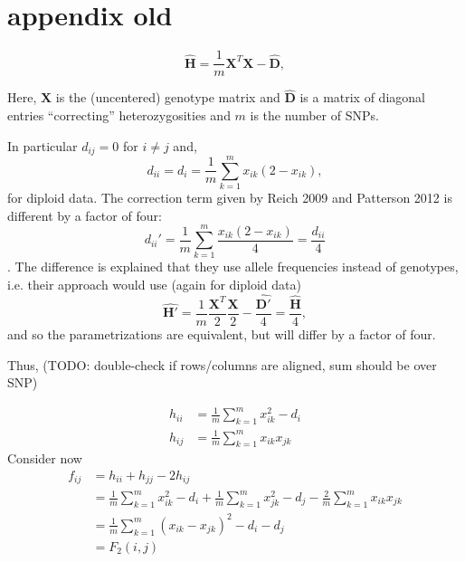 \documentclass[12pt, letterpaper]{article}
\newcommand{\MX}{\mathbf{X}}
\begin{document}
\section{appendix old}
\begin{equation}
    \hat{\mathbf{H}} = \frac{1}{m}\mathbf{X}^T\mathbf{X} - \hat{\mathbf{D}},
\end{equation}

Here, $\MX$ is the (uncentered) genotype matrix and $\hat{\mathbf{D}}$ is a matrix of diagonal entries ``correcting'' heterozygosities and $m$ is the number of SNPs.

In particular $d_{ij} = 0 $ for $i \neq j$ and, 
\begin{equation}
    d_{ii} = d_i = \frac{1}{m}\sum_{k=1}^m x_{ik}(2-x_{ik}),
\end{equation}
for diploid data. The correction term given by Reich 2009 and Patterson 2012 is different by a factor of four:
\begin{equation*}
    d_{ii}' = \frac{1}{m}\sum_{k=1}^m \frac{x_{ik}(2-x_{ik})}{4} = \frac{d_{ii}}{4}
\end{equation*}.
The difference is explained that they use allele frequencies instead of genotypes, i.e. their approach would use (again for diploid data)
\begin{equation*}
    \hat{\mathbf{H}'} = \frac{1}{m}\frac{\mathbf{X}^T}{2}\frac{\mathbf{X}}{2} - \frac{\hat{\mathbf{D'}}}{4} = \frac{\hat{\mathbf{H}}}{4},
\end{equation*}
and so the parametrizations are equivalent, but will differ by a factor of four.

Thus, (TODO: double-check if rows/columns are aligned, sum should be over SNP)

\begin{subequations}\begin{align}
    h_{ii} &= \frac{1}{m}\sum_{k=1}^m x_{ik}^2 - d_i \\
    h_{ij} &= \frac{1}{m}\sum_{k=1}^m x_{ik}x_{jk} 
\end{align}\end{subequations}
Consider now
\begin{align}
    f_{ij} &= h_{ii} + h_{jj} - 2 h_{ij}\nonumber\\
     &= \frac{1}{m}\sum_{k=1}^m x_{ik}^2 - d_i + \frac{1}{m}\sum_{k=1}^m x_{jk}^2 - d_j - \frac{2}{m}\sum_{k=1}^m x_{ik}x_{jk}\nonumber \\
    &= \frac{1}{m} \sum_{k=1}^m (x_{ik} - x_{jk})^2 - d_i - d_j \\
    &= F_2(i,j)\nonumber
\end{align}
\end{document}
